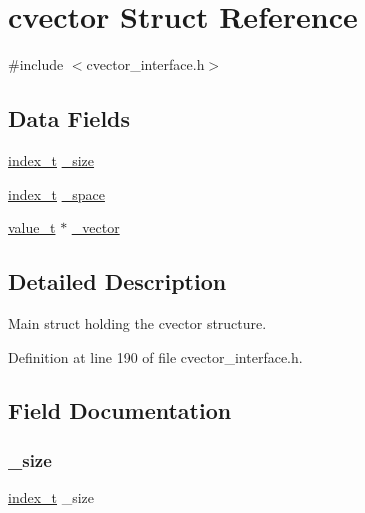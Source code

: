\hypertarget{structcvector}{}\section{cvector Struct Reference}
\label{structcvector}


{\ttfamily \#include $<$cvector\+\_\+interface.\+h$>$}

\subsection*{Data Fields}
\begin{DoxyCompactItemize}
\item 
\hyperlink{cvector__interface_8h_ad722078677c063a09661059674fb996c}{index\+\_\+t} \hyperlink{structcvector_a44c9984fcdd1c44d35235c67909dcc79}{\+\_\+size}
\item 
\hyperlink{cvector__interface_8h_ad722078677c063a09661059674fb996c}{index\+\_\+t} \hyperlink{structcvector_a5948a8ef12921a8fc535fbcb48d4d4d4}{\+\_\+space}
\item 
\hyperlink{cvector__interface_8h_a693b7d81758e9116dfebbbff0daa099b}{value\+\_\+t} $\ast$ \hyperlink{structcvector_ae60afc8a80c3a6c945520216265ebbe0}{\+\_\+vector}
\end{DoxyCompactItemize}


\subsection{Detailed Description}
Main struct holding the cvector structure. 

Definition at line 190 of file cvector\+\_\+interface.\+h.



\subsection{Field Documentation}
\mbox{\label{structcvector_a44c9984fcdd1c44d35235c67909dcc79}} 
\subsubsection{\texorpdfstring{\+\_\+size}{\_size}}
{\footnotesize\ttfamily \hyperlink{cvector__interface_8h_ad722078677c063a09661059674fb996c}{index\+\_\+t} \+\_\+size}



